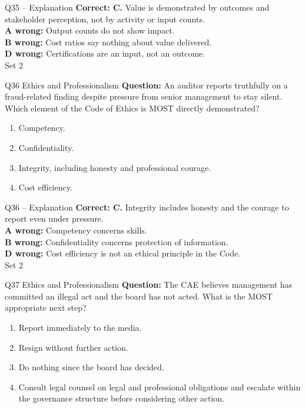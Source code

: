 \documentclass[aspectratio=169,10pt]{beamer}
\begin{document}
\begin{frame}[t]{Q35 -- Explanation}
	\footnotesize
	\textbf{Correct: C.} Value is demonstrated by outcomes and stakeholder perception, not by activity or input counts. \\[5pt]
\textbf{A wrong:} Output counts do not show impact. \\[3pt]
\textbf{B wrong:} Cost ratios say nothing about value delivered. \\[3pt]
\textbf{D wrong:} Certifications are an input, not an outcome. \\[3pt]
	\vfill {\tiny Set 2}
\end{frame}

\begin{frame}[t]{Q36 \hfill {\scriptsize Ethics and Professionalism}}
	\small
	\textbf{Question:} An auditor reports truthfully on a fraud-related finding despite pressure from senior management to stay silent. Which element of the Code of Ethics is MOST directly demonstrated?
	\begin{enumerate}[label=\Alph*.,itemsep=1pt,topsep=3pt]
			\item Competency.
			\item Confidentiality.
			\item Integrity, including honesty and professional courage.
			\item Cost efficiency.
	\end{enumerate}
\end{frame}

\begin{frame}[t]{Q36 -- Explanation}
	\footnotesize
	\textbf{Correct: C.} Integrity includes honesty and the courage to report even under pressure. \\[5pt]
\textbf{A wrong:} Competency concerns skills. \\[3pt]
\textbf{B wrong:} Confidentiality concerns protection of information. \\[3pt]
\textbf{D wrong:} Cost efficiency is not an ethical principle in the Code. \\[3pt]
	\vfill {\tiny Set 2}
\end{frame}

\begin{frame}[t]{Q37 \hfill {\scriptsize Ethics and Professionalism}}
	\small
	\textbf{Question:} The CAE believes management has committed an illegal act and the board has not acted. What is the MOST appropriate next step?
	\begin{enumerate}[label=\Alph*.,itemsep=1pt,topsep=3pt]
			\item Report immediately to the media.
			\item Resign without further action.
			\item Do nothing since the board has decided.
			\item Consult legal counsel on legal and professional obligations and escalate within the governance structure before considering other action.
	\end{enumerate}
\end{frame}
\end{document}
